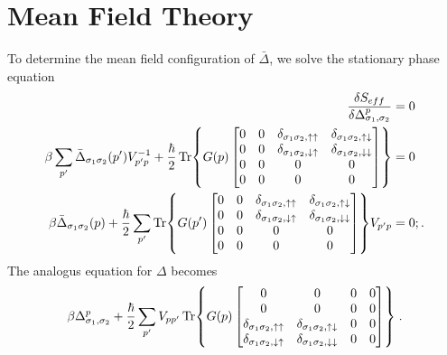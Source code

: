 \documentclass{article}
\begin{document}
\section{Mean Field Theory}
To determine the mean field configuration of $\bar{\Delta}$, we solve the stationary phase equation
\begin{align}
    \frac{\delta S_{eff}}{\delta \Delta_{\sigma_1,\sigma_2}^{p}} &= 0 \nonumber\\
    \beta\sum_{p'} \bar{\Delta}_{\sigma_1 \sigma_2}(p') V^{-1}_{p' p} + \frac{\hbar}{2} \Tr{G(p) 
    \begin{bmatrix}
    0 & 0 & \delta_{\sigma_1 \sigma_2, \uparrow \uparrow} & \delta_{\sigma_1 \sigma_2, \uparrow \downarrow} \\
    0 & 0 & \delta_{\sigma_1 \sigma_2, \downarrow \uparrow} & \delta_{\sigma_1 \sigma_2, \downarrow \downarrow} \\ 
    0 & 0 & 0 & 0 \\ 
    0 & 0 & 0 & 0
    \end{bmatrix}} &=0 \label{stationary phase deltabar}\\
    \beta \bar{\Delta}_{\sigma_1 \sigma_2}(p) + \frac{\hbar}{2} \sum_{p'} \Tr{G(p') 
    \begin{bmatrix}
    0 & 0 & \delta_{\sigma_1 \sigma_2, \uparrow \uparrow} & \delta_{\sigma_1 \sigma_2, \uparrow \downarrow} \\
    0 & 0 & \delta_{\sigma_1 \sigma_2, \downarrow \uparrow} & \delta_{\sigma_1 \sigma_2, \downarrow \downarrow} \\ 
    0 & 0 & 0 & 0 \\ 
    0 & 0 & 0 & 0
    \end{bmatrix}} V_{p' p} &=0 \nonumber;.
\end{align}
The analogus equation for $\Delta$ becomes
\begin{align}
    \beta \Delta_{\sigma_1,\sigma_2}^p + \frac{\hbar}{2} \sum_{p'} V_{pp'} \Tr{G(p) 
    \begin{bmatrix}
    0 & 0 & 0 & 0 \\
    0 & 0 & 0 & 0 \\ 
    \delta_{\sigma_1 \sigma_2, \uparrow \uparrow} & \delta_{\sigma_1 \sigma_2, \uparrow \downarrow} & 0 & 0 \\ 
    \delta_{\sigma_1 \sigma_2, \downarrow \uparrow} & \delta_{\sigma_1 \sigma_2, \downarrow \downarrow} & 0 & 0
    \end{bmatrix}}\;. \label{stationary phase delta}
\end{align}
\end{document}
